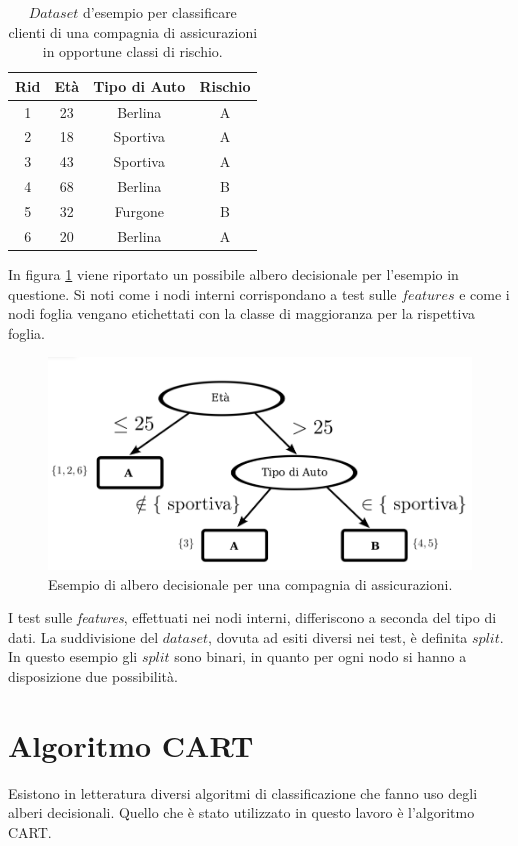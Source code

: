\begin{table}[ht]
    \centering
\begin{tabular}{|c|c|c|c|}
\hline Rid & Età & Tipo di Auto & Rischio \\
\hline 1 & 23 & Berlina & A \\
\hline 2 & 18 & Sportiva & A \\
\hline 3 & 43 & Sportiva & A \\
\hline 4 & 68 & Berlina & B \\
\hline 5 & 32 & Furgone & B \\
\hline6 & 20 & Berlina & A \\
\hline
\end{tabular}
\caption{$Dataset$ d’esempio per classificare clienti di una compagnia di assicurazioni in opportune classi di rischio.}
    \label{tab:esempio}
\end{table}
In figura \ref{fig:esempio} viene riportato un possibile albero decisionale per l'esempio in questione. Si noti come i nodi interni corrispondano a test sulle $features$ e come i nodi foglia vengano etichettati con la classe di maggioranza per la rispettiva foglia.
\begin{figure}
\begin{center}
\includegraphics[width=0.5\columnwidth]{images/albero_esempio.png}
\end{center}
\caption{Esempio di albero decisionale per una compagnia di assicurazioni. }
\label{fig:esempio}
\end{figure}

I test sulle \textit{features}, effettuati nei nodi interni, differiscono a seconda del tipo di dati. La suddivisione del $dataset$, dovuta ad esiti diversi nei test, è definita $split$.\\
In questo esempio gli $split$ sono binari, in quanto per ogni nodo si hanno a disposizione due possibilità.

\section{Algoritmo CART}
Esistono in letteratura diversi algoritmi di classificazione che fanno uso degli alberi decisionali. Quello che è stato utilizzato in questo lavoro è l'algoritmo CART.

